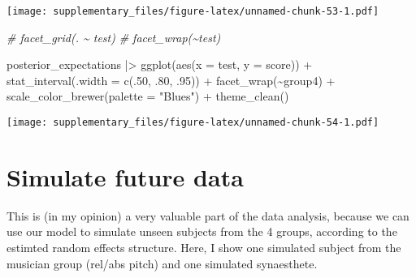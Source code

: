 \documentclass[
  man,floatsintext]{apa7}
\newenvironment{Shaded}{\begin{snugshade}}{\end{snugshade}}
\newcommand{\AttributeTok}[1]{\textcolor[rgb]{0.77,0.63,0.00}{#1}}
\newcommand{\CommentTok}[1]{\textcolor[rgb]{0.56,0.35,0.01}{\textit{#1}}}
\newcommand{\DecValTok}[1]{\textcolor[rgb]{0.00,0.00,0.81}{#1}}
\newcommand{\FunctionTok}[1]{\textcolor[rgb]{0.00,0.00,0.00}{#1}}
\newcommand{\NormalTok}[1]{#1}
\newcommand{\SpecialCharTok}[1]{\textcolor[rgb]{0.00,0.00,0.00}{#1}}
\newcommand{\StringTok}[1]{\textcolor[rgb]{0.31,0.60,0.02}{#1}}
\begin{document}
\texttt{[image: supplementary\_files/figure-latex/unnamed-chunk-53-1.pdf]}

\begin{Shaded}
\begin{Highlighting}[]
  \CommentTok{\# facet\_grid(. \textasciitilde{} test)}
  \CommentTok{\# facet\_wrap(\textasciitilde{}test)}
\end{Highlighting}
\end{Shaded}

\begin{Shaded}
\begin{Highlighting}[]
\NormalTok{posterior\_expectations }\SpecialCharTok{|\textgreater{}} 
  \FunctionTok{ggplot}\NormalTok{(}\FunctionTok{aes}\NormalTok{(}\AttributeTok{x =}\NormalTok{ test, }\AttributeTok{y =}\NormalTok{ score)) }\SpecialCharTok{+}
  \FunctionTok{stat\_interval}\NormalTok{(}\AttributeTok{.width =} \FunctionTok{c}\NormalTok{(.}\DecValTok{50}\NormalTok{, .}\DecValTok{80}\NormalTok{, .}\DecValTok{95}\NormalTok{)) }\SpecialCharTok{+}
  \FunctionTok{facet\_wrap}\NormalTok{(}\SpecialCharTok{\textasciitilde{}}\NormalTok{group4) }\SpecialCharTok{+}
  \FunctionTok{scale\_color\_brewer}\NormalTok{(}\AttributeTok{palette =} \StringTok{"Blues"}\NormalTok{) }\SpecialCharTok{+}
  \FunctionTok{theme\_clean}\NormalTok{()}
\end{Highlighting}
\end{Shaded}

\texttt{[image: supplementary\_files/figure-latex/unnamed-chunk-54-1.pdf]}

\hypertarget{simulate-future-data}{%
\section{Simulate future data}\label{simulate-future-data}}

This is (in my opinion) a very valuable part of the data analysis, because we can use our model to simulate unseen subjects from the 4 groups, according to the estimted random effects structure. Here, I show one simulated subject from the musician group (rel/abs pitch) and one simulated synaesthete.
\end{document}
